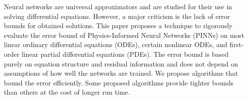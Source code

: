 
Neural networks are universal approximators and are studied for their use in solving differential equations.
However, a major criticism is the lack of error bounds for obtained solutions.
This paper proposes a technique to rigorously evaluate the error bound of Physics-Informed Neural Networks (PINNs) on most linear ordinary differential equations (ODEs), certain nonlinear ODEs, and first-order linear partial differential equations (PDEs).
The error bound is based purely on equation structure and residual information and does not depend on assumptions of how well the networks are trained.
We propose algorithms that bound the error efficiently. 
Some proposed algorithms provide tighter bounds than others at the cost of longer run time.